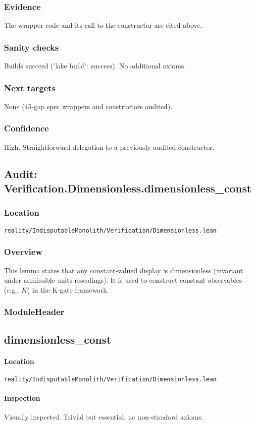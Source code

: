 \documentclass{article}
\newcommand{\FileRef}[1]{\texttt{#1}}
\newcommand{\ModuleHeader}[3]{%
  \subsection{#1}
  \paragraph{Location} \FileRef{#2}\\
  \paragraph{Inspection} #3
}
\begin{document}
\subsubsection{Evidence}
The wrapper code and its call to the constructor are cited above.

\subsubsection{Sanity checks}
Builds succeed (`lake build`: success). No additional axioms.

\subsubsection{Next targets}
None (45‑gap spec wrappers and constructors audited).

\subsubsection{Confidence}
High. Straightforward delegation to a previously audited constructor.

\subsection{Audit: Verification.Dimensionless.dimensionless\_const}
\subsubsection{Location}
\FileRef{reality/IndisputableMonolith/Verification/Dimensionless.lean}

\subsubsection{Overview}
This lemma states that any constant‑valued display is dimensionless (invariant under admissible units rescalings). It is used to construct constant observables (e.g., \(K\)) in the K‑gate framework.

\subsubsection{ModuleHeader}
\ModuleHeader{dimensionless\_const}{reality/IndisputableMonolith/Verification/Dimensionless.lean}{Visually inspected. Trivial but essential; no non‑standard axioms.}
\end{document}
